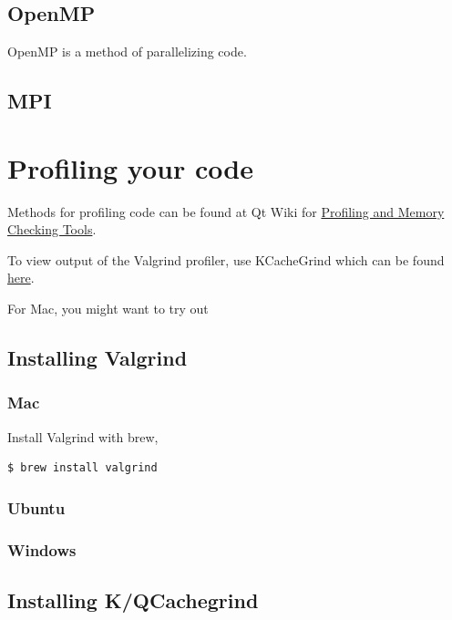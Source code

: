\documentclass[11pt]{article}
\begin{document}
\subsection{OpenMP}
OpenMP is a method of parallelizing code.

\subsection{MPI}

\section{Profiling your code}
Methods for profiling code can be found at Qt Wiki for \href{https://wiki.qt.io/Profiling_and_Memory_Checking_Tools}{Profiling and Memory Checking Tools}.

To view output of the Valgrind profiler, use KCacheGrind which can be found \href{https://github.com/KDE/kcachegrind}{here}.

For Mac, you might want to try out 
\subsection{Installing Valgrind}
\subsubsection{Mac}
Install Valgrind with brew,
\begin{lstlisting}
$ brew install valgrind
\end{lstlisting}


\subsubsection{Ubuntu}
\subsubsection{Windows}
\subsection{Installing K/QCachegrind}

% 


\end{document}
